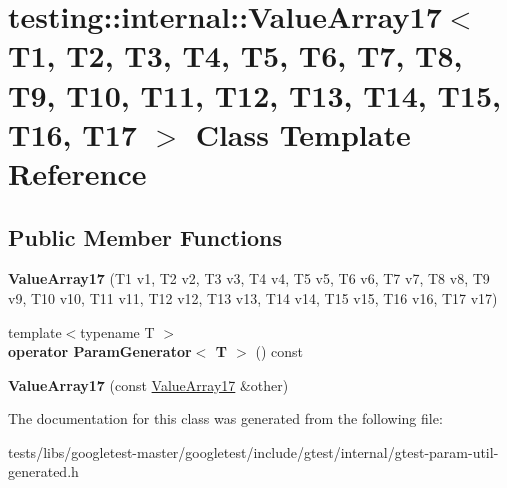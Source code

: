 \hypertarget{classtesting_1_1internal_1_1ValueArray17}{}\section{testing\+:\+:internal\+:\+:Value\+Array17$<$ T1, T2, T3, T4, T5, T6, T7, T8, T9, T10, T11, T12, T13, T14, T15, T16, T17 $>$ Class Template Reference}
\label{classtesting_1_1internal_1_1ValueArray17}
\subsection*{Public Member Functions}
\begin{DoxyCompactItemize}
\item 
\mbox{\label{classtesting_1_1internal_1_1ValueArray17_a943a86a365abde6bdd667e1ad2dbff9b}} 
{\bfseries Value\+Array17} (T1 v1, T2 v2, T3 v3, T4 v4, T5 v5, T6 v6, T7 v7, T8 v8, T9 v9, T10 v10, T11 v11, T12 v12, T13 v13, T14 v14, T15 v15, T16 v16, T17 v17)
\item 
\mbox{\label{classtesting_1_1internal_1_1ValueArray17_a31189716b99483febb83ae7436cd3f6f}} 
{\footnotesize template$<$typename T $>$ }\\{\bfseries operator Param\+Generator$<$ T $>$} () const
\item 
\mbox{\label{classtesting_1_1internal_1_1ValueArray17_a20233ef4958a1b16ec7a8c004f1604fb}} 
{\bfseries Value\+Array17} (const \hyperlink{classtesting_1_1internal_1_1ValueArray17}{Value\+Array17} \&other)
\end{DoxyCompactItemize}


The documentation for this class was generated from the following file\+:\begin{DoxyCompactItemize}
\item 
tests/libs/googletest-\/master/googletest/include/gtest/internal/gtest-\/param-\/util-\/generated.\+h\end{DoxyCompactItemize}
